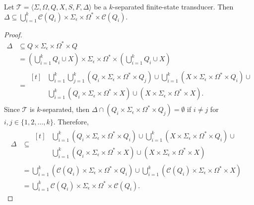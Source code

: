 \begin{proposition}
  Let $\mathcal{T} = \langle \Sigma, \Omega, Q, X, S, F, \Delta \rangle$ be a
  $k$-separated finite-state transducer. Then $\Delta \subseteq \bigcup_{i=1}^k
  \mathcal{C}(Q_i) \times \Sigma_\epsilon \times \Omega^* \times \mathcal{C}(Q_i)$.
\end{proposition}

\begin{proof}
  \begin{align*}
    \Delta &\subseteq Q \times \Sigma_\epsilon \times \Omega^* \times Q\\
    &= (\bigcup_{i=1}^k{Q_i} \cup X) \times \Sigma_\epsilon \times \Omega^* \times
    (\bigcup_{i=1}^k{Q_i} \cup X) &\\
    &= \begin{aligned}[t]
      &\bigcup_{i=1}^k \bigcup_{j=1}^k (Q_i \times
      \Sigma_\epsilon \times \Omega^* \times Q_j) \cup
      \bigcup_{i=1}^k (X \times \Sigma_\epsilon \times \Omega^*
      \times Q_i) \cup                               \\
       & \bigcup_{i=1}^k (Q_i \times \Sigma_\epsilon
      \times \Omega^* \times X) \cup
      (X \times \Sigma_\epsilon \times \Omega^* \times X).
    \end{aligned}
  \end{align*}
  Since $\mathcal{T}$ is $k$-separated, then $\Delta \cap (Q_i \times
    \Sigma_\epsilon \times \Omega^* \times Q_j) = \emptyset$ if $i \neq j$ for
  $i, j \in \{ 1, 2, \ldots, k \}$. Therefore,
  \begin{align*}
    \Delta & \subseteq \begin{aligned}[t]
       & \bigcup_{i=1}^k (Q_i \times \Sigma_\epsilon \times \Omega^*
      \times Q_i) \cup
      \bigcup_{i=1}^k (X \times \Sigma_\epsilon \times \Omega^*
      \times Q_i) \cup                                               \\
       & \bigcup_{i=1}^k (Q_i \times \Sigma_\epsilon
      \times \Omega^* \times X) \cup
      (X \times \Sigma_\epsilon \times \Omega^* \times X)
    \end{aligned}                           & \\
           & = \bigcup_{i=1}^k (\mathcal{C}(Q_i) \times \Sigma_\epsilon \times
    \Omega^* \times Q_i) \cup \bigcup_{i=1}^k (\mathcal{C}(Q_i) \times
    \Sigma_\epsilon \times \Omega^* \times X)                                \\
           & = \bigcup_{i=1}^k \mathcal{C}(Q_i) \times \Sigma_\epsilon \times
    \Omega^* \times \mathcal{C}(Q_i).
  \end{align*}
\end{proof}

